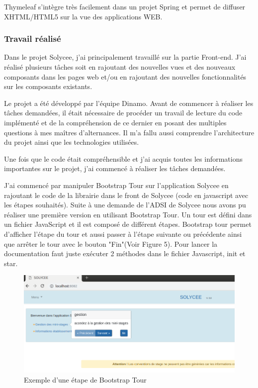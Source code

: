 \documentclass[12pt]{article}
\begin{document}
Thymeleaf s’intègre très facilement dans un projet Spring et permet de diffuser XHTML/HTML5 sur la vue des applications WEB.


\subsubsection{Travail réalisé}


Dans le projet Solycee, j'ai principalement travaillé sur la partie Front-end. J'ai réalisé plusieurs tâches soit en rajoutant des nouvelles vues et des nouveaux composants dans les pages web et/ou en rajoutant des nouvelles fonctionnalités sur les composants existants.

Le projet a été développé par l'équipe Dinamo. Avant de commencer à réaliser les tâches demandées, il était nécessaire de procéder un travail  de lecture du code implémenté et de la compréhension de ce dernier en posant des multiples questions à mes maîtres d'alternances. Il m'a fallu aussi comprendre l'architecture du projet ainsi que les technologies utilisées. 

Une fois que le code était compréhensible et j'ai acquis toutes les informations importantes sur le projet, j'ai commencé à réaliser les tâches demandées.

J'ai commencé par manipuler Bootstrap Tour sur l'application Solycee en rajoutant le code de la librairie dans le front de Solycee (code en javascript avec les étapes souhaités). Suite à une demande de l'ADSI de Solycee nous avons pu réaliser une première version en utilisant Bootstrap Tour. Un tour est défini dans un fichier JavaScript et il est composé de différent étapes. Bootstrap tour permet d'afficher l'étape du tour et aussi passer à l'étape suivante ou précédente ainsi que arrêter le tour avec le bouton "Fin"(Voir Figure 5). Pour lancer la documentation faut juste exécuter  2 méthodes dans le fichier Javascript, init et star. 
\begin{figure}[H]
	\centering
 		\includegraphics[width=1\textwidth]{diagrammes/exemple_Tour.png} 
  		\caption{Exemple d'une étape de Bootstrap Tour}
	\end{figure}
\end{document}
